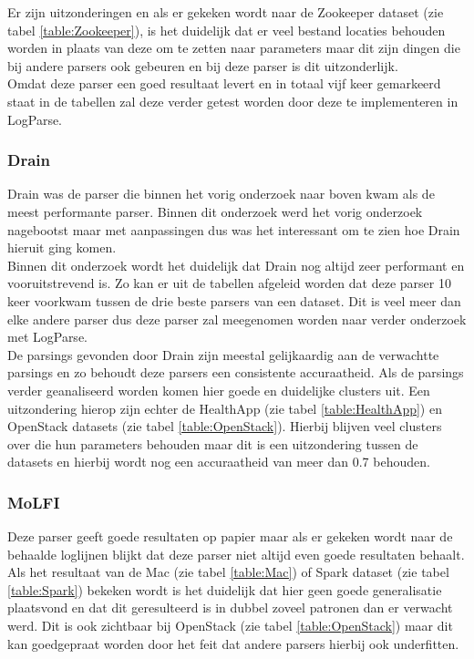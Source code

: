 Er zijn uitzonderingen en als er gekeken wordt naar de Zookeeper dataset (zie tabel \ref{table:Zookeeper}), is het duidelijk dat er veel bestand locaties behouden worden in plaats van deze om te zetten naar parameters maar dit zijn dingen die bij andere parsers ook gebeuren en bij deze parser is dit uitzonderlijk.\\

Omdat deze parser een goed resultaat levert en in totaal vijf keer gemarkeerd staat in de tabellen zal deze verder getest worden door deze te implementeren in LogParse.

\subsubsection{Drain}
Drain was de parser die binnen het vorig onderzoek naar boven kwam als de meest performante parser. Binnen dit onderzoek werd het vorig onderzoek nagebootst maar met aanpassingen dus was het interessant om te zien hoe Drain hieruit ging komen.\\

Binnen dit onderzoek wordt het duidelijk dat Drain nog altijd zeer performant en vooruitstrevend is. Zo kan er uit de tabellen afgeleid worden dat deze parser 10 keer voorkwam tussen de drie beste parsers van een dataset. Dit is veel meer dan elke andere parser dus deze parser zal meegenomen worden naar verder onderzoek met LogParse.\\

De parsings gevonden door Drain zijn meestal gelijkaardig aan de verwachtte parsings en zo behoudt deze parsers een consistente accuraatheid. Als de parsings verder geanaliseerd worden komen hier goede en duidelijke clusters uit. Een uitzondering hierop zijn echter de HealthApp (zie tabel \ref{table:HealthApp}) en OpenStack datasets (zie tabel \ref{table:OpenStack}). Hierbij blijven veel clusters over die hun parameters behouden maar dit is een uitzondering tussen de datasets en hierbij wordt nog een accuraatheid van meer dan 0.7 behouden.

\subsubsection{MoLFI}
Deze parser geeft goede resultaten op papier maar als er gekeken wordt naar de behaalde loglijnen blijkt dat deze parser niet altijd even goede resultaten behaalt. Als het resultaat van de Mac (zie tabel \ref{table:Mac}) of Spark dataset (zie tabel \ref{table:Spark}) bekeken wordt is het duidelijk dat hier geen goede generalisatie plaatsvond en dat dit geresulteerd is in dubbel zoveel patronen dan er verwacht werd. Dit is ook zichtbaar bij OpenStack (zie tabel \ref{table:OpenStack}) maar dit kan goedgepraat worden door het feit dat andere parsers hierbij ook underfitten.\\

